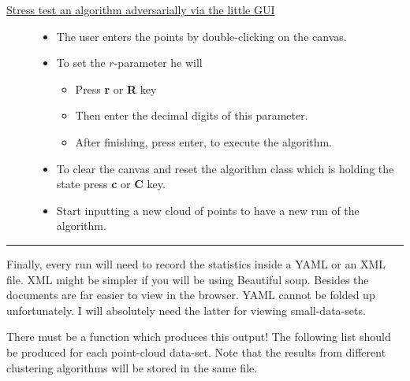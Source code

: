 \documentclass[11pt]{article}
\begin{document}
\begin{description}
\item[{\uline{Stress test an algorithm adversarially via the little GUI}}] \begin{itemize}
\item The user enters the points by double-clicking on the canvas.

\item To set the $r$-parameter he will 
\begin{itemize}
\item Press \textbf{r} or \textbf{R} key
\item Then enter the decimal digits of this parameter.
\item After finishing, press enter, to execute the algorithm.
\end{itemize}

\item To clear the canvas and reset the algorithm class which is 
holding the state press \textbf{c} or \textbf{C} key.

\item Start inputting a new cloud of points to have a new run of the 
algorithm.
\end{itemize}
\end{description}

\rule{\linewidth}{0.5pt}

Finally, every run will need to record the statistics inside a YAML or an XML file. 
XML might be simpler if you will be using Beautiful soup. Besides the documents 
are far easier to view in the browser. YAML cannot be folded up unfortunately.
I will absolutely need the latter for viewing small-data-sets. 

There must be a function which produces this output! The following list should 
be produced for each point-cloud data-set. Note that the results from different 
clustering algorithms will be stored in the same file.   
\end{document}
